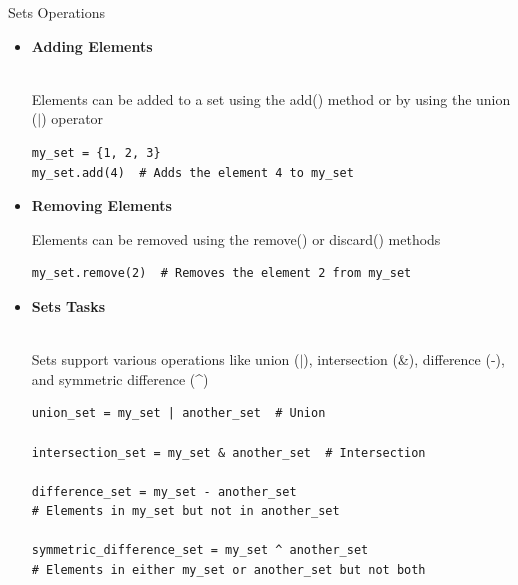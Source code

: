 \documentclass[
	11pt, 
]{beamer}
\begin{document}
\begin{frame}[fragile]{Sets Operations}
\scriptsize
\begin{itemize}
    \item \textbf{Adding Elements} \\ \\ \smallskip

    Elements can be added to a set using the add() method or by using the union ($\vert$) operator
    
\begin{verbatim} 
my_set = {1, 2, 3}
my_set.add(4)  # Adds the element 4 to my_set
\end{verbatim}

    \item \textbf{Removing Elements}
    
    Elements can be removed using the remove() or discard() methods
    
    \begin{verbatim} 
my_set.remove(2)  # Removes the element 2 from my_set
    \end{verbatim}

    \item \textbf{Sets Tasks} \\ \\ \smallskip

     Sets support various operations like union ($\vert$), intersection (\&), difference (-), and symmetric difference (\^{})
     
\begin{verbatim} 
union_set = my_set | another_set  # Union 

intersection_set = my_set & another_set  # Intersection 

difference_set = my_set - another_set  
# Elements in my_set but not in another_set

symmetric_difference_set = my_set ^ another_set  
# Elements in either my_set or another_set but not both
\end{verbatim}

\end{itemize}
\end{frame}



\end{document}
